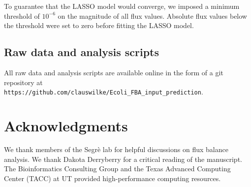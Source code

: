 \documentclass[12pt]{article}
\begin{document}
To guarantee that the LASSO model would converge, we imposed a minimum threshold of $10^{-6}$ on the magnitude of all flux values. Absolute flux values below the threshold were set to zero before fitting the LASSO model.

\subsection{Raw data and analysis scripts}

All raw data and analysis scripts are available online in the form of a git repository at\\ \texttt{https://github.com/clauswilke/Ecoli\_FBA\_input\_prediction}.




\section{Acknowledgments}
We thank members of the Segr\`e lab for helpful discussions on flux balance analysis. We thank Dakota Derryberry for a critical reading of the manuscript. The Bioinformatics Consulting Group and the Texas Advanced Computing Center (TACC) at UT provided high-performance computing resources. 


%
\end{document}
